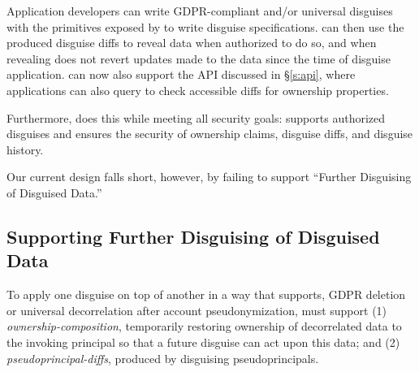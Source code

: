 Application developers can write GDPR-compliant and/or universal disguises with the primitives
exposed by \sys to write disguise specifications.
%
\sys can then use the produced disguise diffs to reveal data when authorized to do so, and when
revealing does not revert updates made to the data since the time of disguise application.
%
\sys can now also support the API discussed in \S\ref{s:api}, where applications can also query \sys to check accessible diffs for
ownership properties.

Furthermore, \sys does this while meeting all security goals: \sys supports authorized disguises and
ensures the security of ownership claims, disguise diffs, and disguise history.

Our current design falls short, however, by failing to support ``Further Disguising of Disguised
Data.''


\subsection{Supporting Further Disguising of Disguised Data}

To apply one disguise on top of another in a way that supports, \eg GDPR deletion or universal
decorrelation after account pseudonymization, \sys must support (1) \emph{ownership-composition},
temporarily restoring ownership of decorrelated data to the invoking principal so that a future
disguise can act upon this data; and (2) \emph{pseudoprincipal-diffs}, produced by disguising
pseudoprincipals. 

